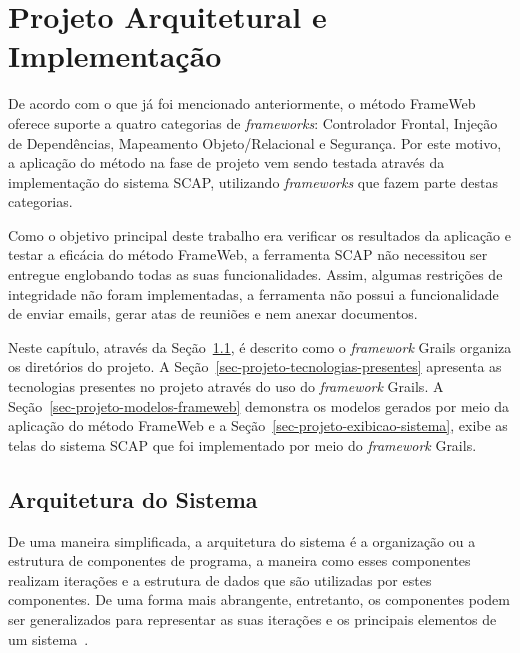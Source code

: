 \chapter{Projeto Arquitetural e Implementação}
\label{sec-projeto}

De acordo com o que já foi mencionado anteriormente, o método FrameWeb oferece suporte a quatro categorias de \textit{frameworks}: Controlador Frontal, Injeção de Dependências, Mapeamento Objeto/Relacional e Segurança. Por este motivo, a aplicação do método na fase de projeto vem sendo testada através da implementação do sistema SCAP, utilizando \textit{frameworks} que fazem parte destas categorias.

Como o objetivo principal deste trabalho era verificar os resultados da aplicação e testar a eficácia do método FrameWeb, a ferramenta SCAP não necessitou ser entregue englobando todas as suas funcionalidades. Assim, algumas restrições de integridade não foram implementadas, a ferramenta não possui a funcionalidade de enviar emails, gerar atas de reuniões e nem anexar documentos.

Neste capítulo, através da Seção~\ref{sec-projeto-arquitetura-sistema}, é descrito como o \textit{framework} Grails organiza os diretórios do projeto. A Seção~\ref{sec-projeto-tecnologias-presentes} apresenta as tecnologias presentes no projeto através do uso do \textit{framework} Grails. A Seção~\ref{sec-projeto-modelos-frameweb} demonstra os modelos gerados por meio da aplicação do método FrameWeb e a Seção~\ref{sec-projeto-exibicao-sistema}, exibe as telas do sistema SCAP que foi implementado por meio do \textit{framework} Grails.           

\section{Arquitetura do Sistema}
\label{sec-projeto-arquitetura-sistema}

De uma maneira simplificada, a arquitetura do sistema é a organização ou a estrutura de componentes de programa, a maneira como esses componentes realizam iterações e a estrutura de dados que são utilizadas por estes componentes. De uma forma mais abrangente, entretanto, os componentes podem ser generalizados para representar as suas iterações e os principais elementos de um sistema~\cite{pressman:es11}.

